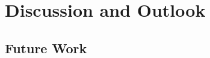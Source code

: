 \chapter{Discussion and Outlook}%
\label{cha:discussion}


\section{Future Work}%
\label{sec:future_work}


